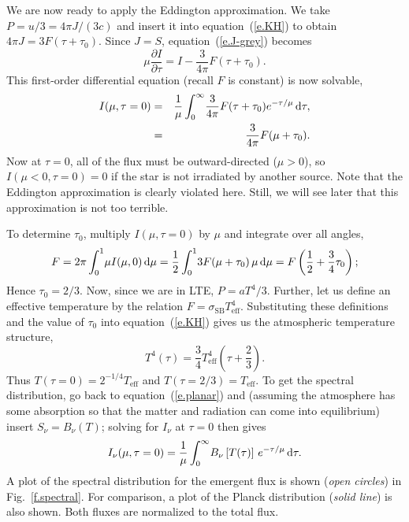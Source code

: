 We are now ready to apply the Eddington approximation.  We take $P = u/3 = 4\pi J/(3c)$ and insert it into equation~(\ref{e.KH}) to obtain $4\pi J = 3F(\tau + \tau_{0})$. Since $J = S$, equation~(\ref{e.J-grey}) becomes
\begin{equation}
\mu\frac{\partial I}{\partial\tau} = I - \frac{3}{4\pi}F(\tau+\tau_{0}).
\end{equation}
This first-order differential equation (recall $F$ is constant) is now solvable,
\begin{eqnarray}
I(\mu,\tau=0) &=& \frac{1}{\mu}\int_{0}^{\infty}\!\frac{3}{4\pi}F(\tau + \tau_{0}) e^{-\tau/\mu}\,\mathrm{d}\tau,\nonumber\\
  &=& \frac{3}{4\pi}F(\mu + \tau_{0}).
\end{eqnarray}
Now at $\tau = 0$, all of the flux must be outward-directed ($\mu >0$), so $I(\mu < 0,\tau = 0) = 0$ if the star is not irradiated by another source.  Note that the Eddington approximation is clearly violated here.  Still, we will see later that this approximation is not too terrible. 

To determine $\tau_{0}$, multiply $I(\mu,\tau = 0)$ by $\mu$ and integrate over all angles,
\begin{equation}
F = 2\pi\int_{0}^{1}\!\mu I(\mu,0)\,\mathrm{d}\mu = \frac{1}{2}\int_{0}^{1}\!3F(\mu + \tau_{0})\,\mu\,\mathrm{d}\mu = F\left(\frac{1}{2} + \frac{3}{4}\tau_{0}\right);
\end{equation}
Hence $\tau_{0} = 2/3$. Now, since we are in LTE, $P = aT^{4}/3$. Further, let us define an effective temperature by the relation $F = \sigma_{\mathrm{SB}}T_{\mathrm{eff}}^{4}$.  Substituting these definitions and the value of $\tau_{0}$ into equation~(\ref{e.KH}) gives us the atmospheric temperature structure,
\begin{equation}\label{e.Eddington}
T^{4}(\tau) = \frac{3}{4}T_{\mathrm{eff}}^{4}\left(\tau + \frac{2}{3}\right).
\end{equation}
Thus $T(\tau  = 0) = 2^{-1/4} T_{\mathrm{eff}}$ and $T(\tau = 2/3) = T_{\mathrm{eff}}$.  To get the spectral distribution, go back to equation~(\ref{e.planar}) and (assuming the atmosphere has some absorption so that the matter and radiation can come into equilibrium) insert $S_{\nu} = B_{\nu}(T)$; solving for $I_{\nu}$ at $\tau = 0$ then gives
\begin{equation}\label{e.spectral}
I_{\nu}(\mu,\tau=0) = \frac{1}{\mu}\int_{0}^{\infty}\!B_{\nu}\left[T(\tau)\right] \, e^{-\tau/\mu}\,\mathrm{d}\tau.
\end{equation}
A plot of the spectral distribution for the emergent flux is shown (\emph{open circles}) in Fig.~\ref{f.spectral}. For comparison, a plot of the Planck distribution (\emph{solid line}) is also shown. Both fluxes are normalized to the total flux.

